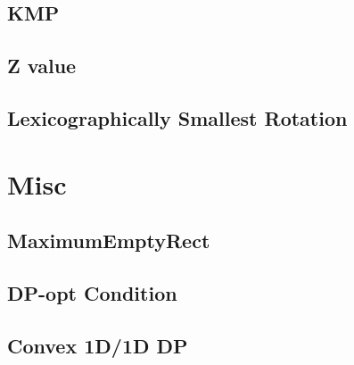 \documentclass[a4paper,10pt,twocolumn,oneside]{article}
\begin{document}
\subsection{KMP}

\subsection{Z value}

%
%
\subsection{Lexicographically Smallest Rotation}

%

\section{Misc}
\subsection{MaximumEmptyRect}

\subsection{DP-opt Condition}

\subsection{Convex 1D/1D DP}

\end{document}
